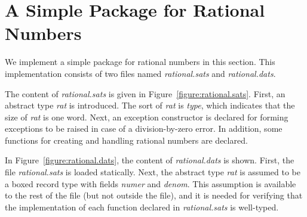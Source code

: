


\section{A Simple Package for Rational Numbers}
We implement a simple package for rational numbers in this section.  This
implementation consists of two files named {\it rational.sats} and {\it
rational.dats}.

The content of {\it rational.sats} is given in
Figure~\ref{figure:rational.sats}.  First, an abstract type {\it rat} is
introduced. The sort of {\it rat} is {\it type}, which indicates that the
size of {\it rat} is one word. Next, an exception constructor is declared
for forming exceptions to be raised in case of a division-by-zero error.
In addition, some functions for creating and handling rational numbers are
declared.

In Figure~\ref{figure:rational.dats}, the content of {\it rational.dats} is
shown. First, the file {\it rational.sats} is loaded statically. Next, the
abstract type {\it rat} is assumed to be a boxed record type with fields
{\it numer} and {\it denom}. This assumption is available to the rest of
the file (but not outside the file), and it is needed for verifying that
the implementation of each function declared in {\it rational.sats} is
well-typed.

%
